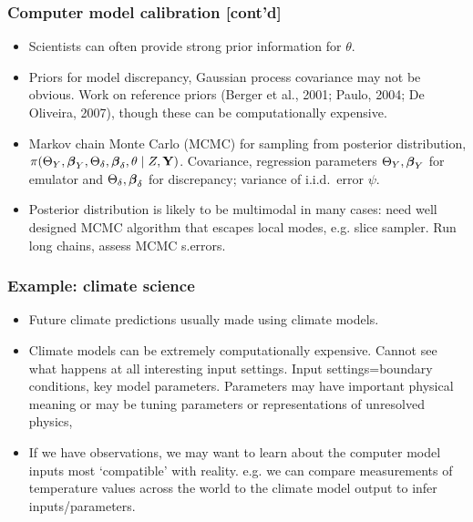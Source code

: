 \documentclass{beamer}
\begin{document}
\begin{frame}
  \frametitle{Computer model calibration [cont'd] }
  \begin{itemize}
  \item Scientists can often provide strong prior information for
    $\theta$. %
  \item Priors for model discrepancy, Gaussian process covariance may
    not be obvious. Work on reference priors (Berger et al., 2001;
    Paulo, 2004; De Oliveira, 2007), though these can be
    computationally expensive.
  \item Markov chain Monte Carlo (MCMC) for sampling from posterior
    distribution,
    $\pi(\Theta_{Y},\mbox{\boldmath $\beta$}_Y,\Theta_{\delta},\mbox{\boldmath $\beta$}_{\delta},\theta\mid
    Z,{\bf Y})$. Covariance, regression parameters $\Theta_{Y},\mbox{\boldmath $\beta$}_Y$
    for emulator and $\Theta_{\delta},\mbox{\boldmath $\beta$}_{\delta}$ for
    discrepancy; variance of i.i.d.\ error $\psi$.
\item Posterior distribution is likely to be multimodal in many cases:
  need well designed MCMC algorithm that escapes local modes,
  e.g. slice sampler.  Run long chains, assess MCMC s.errors.
  \end{itemize}
\end{frame}



\begin{frame}
  \frametitle{Example: climate science }
  \begin{itemize}
  \item Future climate predictions usually made using climate models.
  \item Climate models can be extremely computationally
    expensive. %
    Cannot see what happens at all interesting input
    settings. Input settings=boundary conditions, key model
    parameters. Parameters may have important physical meaning or may
    be tuning parameters or representations of unresolved physics,
  \item If we have observations, we may want to learn about the
    computer model inputs most `compatible' with reality.  e.g. we can
    compare measurements of temperature values across the world to the
    climate model output to infer inputs/parameters.
  \end{itemize}
\end{frame}
\end{document}
